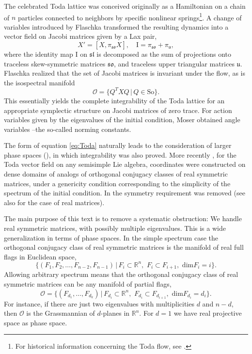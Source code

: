 \documentclass[reqno]{amsart}
\newcommand{\uu}{\mathfrak{u}}
\newcommand{\so}{\mathfrak{so}}
\newcommand{\cO}{\mathcal{O}}
\newcommand{\R}{\mathbb{R}}
\newcommand{\So}{\mathrm{So}}
\theoremstyle{definition} %
\begin{document}
 The celebrated Toda lattice was conceived originally  \cite{T} as a Hamiltonian on a chain of $n$ particles connected to neighbors by specific nonlinear springs\footnote{For  historical information concerning the Toda flow, see \cite{DLSTT}.}. A change of variables introduced by Flaschka  \cite{Fl} transformed the resulting dynamics into a vector field  on Jacobi matrices given by a Lax pair,
\begin{equation}\label{eq:Toda}
	X'=[X,\pi_\so X],\quad \mathrm{I}=\pi_\so+ \pi_{\uu},
\end{equation}
where the identity map $\mathrm{I}$ on $\mathfrak{sl}$ is decomposed as the sum of projections
onto traceless skew-symmetric matrices $\so$, and traceless upper triangular matrices $\uu$. Flaschka realized that the set of Jacobi matrices is invariant under the flow, as is the  isospectral manifold
\[\cO=\{ Q^T X Q\,|\, Q \in \So\}.\] This essentially yields the complete integrability of the Toda lattice for an appropriate symplectic structure on Jacobi matrices of zero trace. For  action variables given by the eigenvalues of the initial condition, Moser \cite{Mo} obtained angle variables --the so-called norming constants.

The form of  equation \eqref{eq:Toda} naturally leads to the consideration of larger phase spaces (\cite{DLNT1, DLT2}), in which integrability was also proved. More recently \cite{MT}, for
the Toda vector field on any semisimple Lie algebra, coordinates were constructed on dense domains of analogs of orthogonal conjugacy classes of real symmetric matrices, under a genericity condition corresponding to the simplicity of the spectrum of the initial condition.  In \cite{MT2} the symmetry requirement was removed (see also \cite{LMST} for the case of real matrices).

The main purpose of this text is to remove a systematic obstruction: We handle real symmetric matrices,  with possibly multiple eigenvalues. This is a wide generalization in terms of phase spaces. In the simple spectrum case the orthogonal conjugacy class of real symmetric matrices is the manifold of real full flags in Euclidean space,
\[\{(F_1,F_2, \dots ,F_{n-2},F_{n-1})\,|\,F_i\subset\R^n,\,\,F_i\subset F_{i+1},\,\,\mathrm{dim} F_i=i\}.\]
Allowing arbitrary spectrum means that the orthogonal conjugacy class of real symmetric matrices can be any manifold of partial flags,
\[\cO=\{(F_{d_1},\dots,F_{d_k})\,|\,F_{d_i}\subset\R^n,\,\,F_{d_i}\subset F_{d_{i+1}},\,\,\mathrm{dim} F_{d_i}=d_i\}.\]
For instance, if there are just two eigenvalues with multiplicities $d$ and $n-d$, then $\cO$ is the Grassmannian of $d$-planes in $\R^n$. For $d=1$ we have real projective space as phase space.
\end{document}
